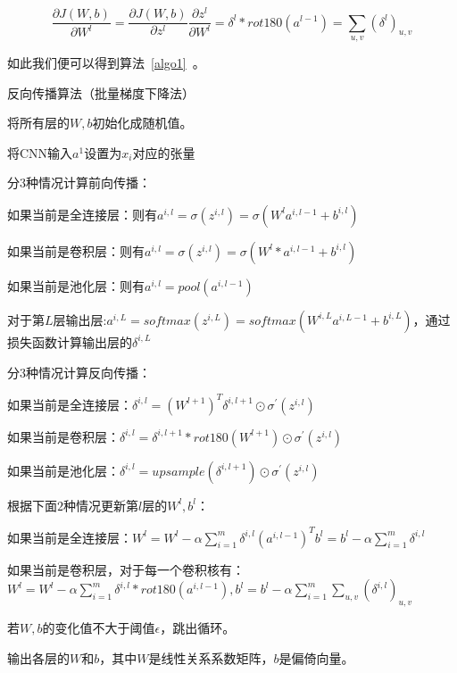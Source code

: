 \begin{equation}
\label{eq:8}
\frac{\partial J(W,b)}{\partial W^{l}} = \frac{\partial J(W,b)}{\partial z^{l}}\frac{\partial z^{l}}{\partial W^{l}} = \delta^l * rot180( a^{l-1})= \sum\limits_{u,v}(\delta^l)_{u,v}
\end{equation}

如此我们便可以得到算法~\ref{algo1}~。

\begin{algorithm}
\caption{反向传播算法（批量梯度下降法）}
\label{algo1}
%

将所有层的$W,b$初始化成随机值。

{
	{
		将CNN输入$a^1$设置为$x_i$对应的张量
		
			{
				分3种情况计算前向传播：
				
				如果当前是全连接层：则有$a^{i,l} = \sigma(z^{i,l}) = \sigma(W^la^{i,l-1} + b^{i,l})$
				
				如果当前是卷积层：则有$a^{i,l} = \sigma(z^{i,l}) = \sigma(W^l*a^{i,l-1} + b^{i,l})$
				
				如果当前是池化层：则有$a^{i,l}= pool(a^{i,l-1})$
			}
		对于第$L$层输出层:$a^{i,L}= softmax(z^{i,L}) = softmax(W^{i,L}a^{i,L-1} +b^{i,L})$，通过损失函数计算输出层的$\delta^{i,L}$
		
			{
				分3种情况计算反向传播：
						
				如果当前是全连接层：$\delta^{i,l} =  (W^{l+1})^T\delta^{i,l+1}\odot \sigma^{'}(z^{i,l})$
						
				如果当前是卷积层：$\delta^{i,l} = \delta^{i,l+1}*rot180(W^{l+1}) \odot  \sigma^{'}(z^{i,l})$
						
				如果当前是池化层：$\delta^{i,l} =  upsample(\delta^{i,l+1}) \odot \sigma^{'}(z^{i,l})$
			}
	}
	{
	    根据下面$2$种情况更新第$l$层的$W^l,b^l$：
	    
	    如果当前是全连接层：$W^l = W^l -\alpha \sum\limits_{i=1}^m \delta^{i,l}(a^{i, l-1})^T$$ $$b^l = b^l -\alpha \sum\limits_{i=1}^m \delta^{i,l}$
	    
	    如果当前是卷积层，对于每一个卷积核有：$W^l = W^l -\alpha \sum\limits_{i=1}^m \delta^{i,l}* rot180(a^{i, l-1}), b^l = b^l -\alpha \sum\limits_{i=1}^m \sum\limits_{u,v}(\delta^{i,l})_{u,v}$
	}
	若$W,b$的变化值不大于阈值$\epsilon$，跳出循环。
	
	输出各层的$W$和$b$，其中$W$是线性关系系数矩阵，$b$是偏倚向量。
}
\end{algorithm}

